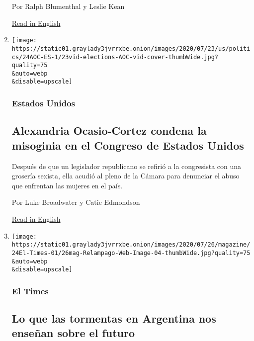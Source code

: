 \begin{enumerate}
  Por Ralph Blumenthal y Leslie Kean

  \href{https://www.nytimes3xbfgragh.onion/2020/07/23/us/politics/pentagon-ufo-harry-reid-navy.html}{Read
  in English}
\item
  \href{/es/2020/07/24/espanol/estados-unidos/alexandria-ocasio-cortez-insulto.html}{}

  \texttt{[image: https://static01.graylady3jvrrxbe.onion/images/2020/07/23/us/politics/24AOC-ES-1/23vid-elections-AOC-vid-cover-thumbWide.jpg?quality=75\\\&auto=webp\\\&disable=upscale]}

  \hypertarget{estados-unidos}{%
  \subsubsection{Estados Unidos}\label{estados-unidos}}

  \hypertarget{alexandria-ocasio-cortez-condena-la-misoginia-en-el-congreso-de-estados-unidos}{%
  \subsection{Alexandria Ocasio-Cortez condena la misoginia en el
  Congreso de Estados
  Unidos}\label{alexandria-ocasio-cortez-condena-la-misoginia-en-el-congreso-de-estados-unidos}}

  Después de que un legislador republicano se refirió a la congresista
  con una grosería sexista, ella acudió al pleno de la Cámara para
  denunciar el abuso que enfrentan las mujeres en el país.

  Por Luke Broadwater y Catie Edmondson

  \href{https://www.nytimes3xbfgragh.onion/2020/07/23/us/alexandria-ocasio-cortez-sexism-congress.html}{Read
  in English}
\item
  \href{/es/2020/07/24/espanol/coronavirus-pseudociencia-mms-cloro.html}{}

  \texttt{[image: https://static01.graylady3jvrrxbe.onion/images/2020/07/26/magazine/24El-Times-01/26mag-Relampago-Web-Image-04-thumbWide.jpg?quality=75\\\&auto=webp\\\&disable=upscale]}

  \hypertarget{el-times}{%
  \subsubsection{El Times}\label{el-times}}

  \hypertarget{lo-que-las-tormentas-en-argentina-nos-enseuxf1an-sobre-el-futuro}{%
  \subsection{Lo que las tormentas en Argentina nos enseñan sobre el
  futuro}\label{lo-que-las-tormentas-en-argentina-nos-enseuxf1an-sobre-el-futuro}}


\end{enumerate}
